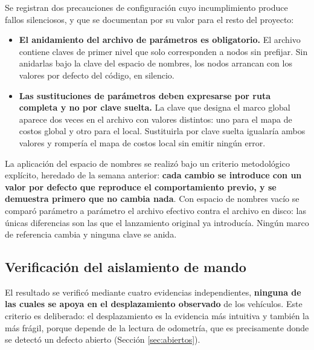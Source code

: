 \documentclass[12pt,letterpaper]{article}
\begin{document}
Se registran dos precauciones de configuración cuyo incumplimiento produce fallos silenciosos, y que se documentan por su valor para el resto del proyecto:

\begin{itemize}
    \item \textbf{El anidamiento del archivo de parámetros es obligatorio.} El archivo contiene claves de primer nivel que solo corresponden a nodos sin prefijar. Sin anidarlas bajo la clave del espacio de nombres, los nodos arrancan con los valores por defecto del código, en silencio.
    \item \textbf{Las sustituciones de parámetros deben expresarse por ruta completa y no por clave suelta.} La clave que designa el marco global aparece dos veces en el archivo con valores distintos: uno para el mapa de costos global y otro para el local. Sustituirla por clave suelta igualaría ambos valores y rompería el mapa de costos local sin emitir ningún error.
\end{itemize}

La aplicación del espacio de nombres se realizó bajo un criterio metodológico explícito, heredado de la semana anterior: \textbf{cada cambio se introduce con un valor por defecto que reproduce el comportamiento previo, y se demuestra primero que no cambia nada}. Con espacio de nombres vacío se comparó parámetro a parámetro el archivo efectivo contra el archivo en disco: las únicas diferencias son las que el lanzamiento original ya introducía. Ningún marco de referencia cambia y ninguna clave se anida.

\subsection{Verificación del aislamiento de mando}

El resultado se verificó mediante cuatro evidencias independientes, \textbf{ninguna de las cuales se apoya en el desplazamiento observado} de los vehículos. Este criterio es deliberado: el desplazamiento es la evidencia más intuitiva y también la más frágil, porque depende de la lectura de odometría, que es precisamente donde se detectó un defecto abierto (Sección \ref{sec:abiertos}).
\end{document}
